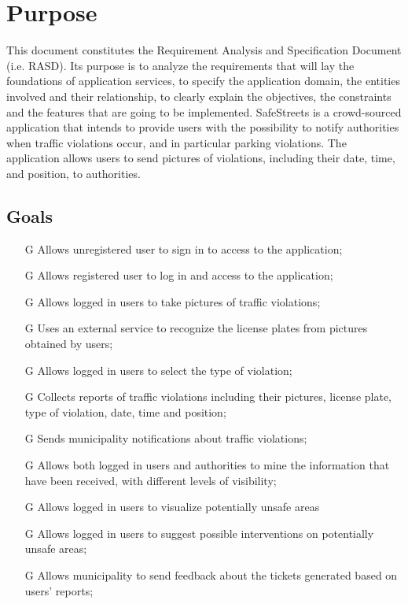 \documentclass[../../rasd.tex]{subfiles}
\begin{document}
\section{Purpose\label{sect:1.1}}

This document constitutes the Requirement Analysis and Specification Document (i.e. RASD). Its purpose is to analyze the requirements that will lay the foundations of application services, to specify the application domain, the entities involved and their relationship, to clearly explain the objectives, the constraints and the features that are going to be implemented. \newline
SafeStreets is a crowd-sourced application that intends to provide users with the possibility to notify authorities when traffic violations occur, and in particular parking violations. The application allows users to send pictures of violations, including their date, time, and position, to authorities.
			
			\subsection{Goals\label{sect:1.1.1}}
			\begin{itemize}
				
		\item[G\subs{1}]Allows unregistered user to sign in to access to the application;
		\item[G\subs{2}]Allows registered user to log in and access to the application;
		\item[G\subs{3}]Allows logged in users to take pictures of traffic violations;
		\item[G\subs{4}]Uses an external service to recognize the license plates from pictures obtained by users;
		\item[G\subs{5}]Allows logged in users to select the type of violation;
		\item[G\subs{6}]Collects reports of traffic violations including their pictures, license plate, type of violation, date, time and position;
		\item[G\subs{7}]Sends municipality notifications about traffic violations;
		\item[G\subs{8}]Allows both logged in users and authorities to mine the information that have been received, with different levels of visibility;
		\item[G\subs{9}]Allows logged in users to visualize potentially unsafe areas
		\item[G\subs{10}]Allows logged in users to suggest possible interventions on potentially unsafe areas;
		\item[G\subs{11}]Allows municipality to send feedback about the tickets generated based on users’ reports;
		
			\end{itemize}
\end{document}
